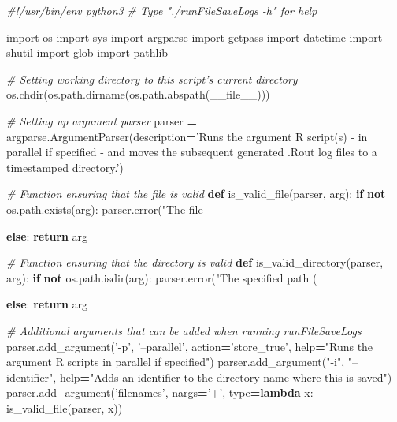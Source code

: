 \documentclass[]{book}
\newenvironment{Shaded}{\begin{snugshade}}{\end{snugshade}}
\newcommand{\KeywordTok}[1]{\textcolor[rgb]{0.13,0.29,0.53}{\textbf{#1}}}
\newcommand{\SpecialCharTok}[1]{\textcolor[rgb]{0.00,0.00,0.00}{#1}}
\newcommand{\StringTok}[1]{\textcolor[rgb]{0.31,0.60,0.02}{#1}}
\newcommand{\ImportTok}[1]{#1}
\newcommand{\CommentTok}[1]{\textcolor[rgb]{0.56,0.35,0.01}{\textit{#1}}}
\newcommand{\VariableTok}[1]{\textcolor[rgb]{0.00,0.00,0.00}{#1}}
\newcommand{\ControlFlowTok}[1]{\textcolor[rgb]{0.13,0.29,0.53}{\textbf{#1}}}
\newcommand{\OperatorTok}[1]{\textcolor[rgb]{0.81,0.36,0.00}{\textbf{#1}}}
\newcommand{\BuiltInTok}[1]{#1}
\newcommand{\NormalTok}[1]{#1}
\begin{document}
\begin{Shaded}
\begin{Highlighting}[]
\CommentTok{#!/usr/bin/env python3}
\CommentTok{# Type "./runFileSaveLogs -h" for help}

\ImportTok{import}\NormalTok{ os}
\ImportTok{import}\NormalTok{ sys}
\ImportTok{import}\NormalTok{ argparse}
\ImportTok{import}\NormalTok{ getpass}
\ImportTok{import}\NormalTok{ datetime}
\ImportTok{import}\NormalTok{ shutil}
\ImportTok{import}\NormalTok{ glob}
\ImportTok{import}\NormalTok{ pathlib}

\CommentTok{# Setting working directory to this script's current directory}
\NormalTok{os.chdir(os.path.dirname(os.path.abspath(}\VariableTok{__file__}\NormalTok{)))}

\CommentTok{# Setting up argument parser}
\NormalTok{parser }\OperatorTok{=}\NormalTok{ argparse.ArgumentParser(description}\OperatorTok{=}\StringTok{'Runs the argument R script(s) - in parallel if specified - and moves the subsequent generated .Rout log files to a timestamped directory.'}\NormalTok{)}

\CommentTok{# Function ensuring that the file is valid}
\KeywordTok{def}\NormalTok{ is_valid_file(parser, arg):}
    \ControlFlowTok{if} \KeywordTok{not}\NormalTok{ os.path.exists(arg):}
\NormalTok{        parser.error(}\StringTok{"The file }\SpecialCharTok{%
    \ControlFlowTok{else}\NormalTok{:}
        \ControlFlowTok{return}\NormalTok{ arg}

\CommentTok{# Function ensuring that the directory is valid}
\KeywordTok{def}\NormalTok{ is_valid_directory(parser, arg):}
    \ControlFlowTok{if} \KeywordTok{not}\NormalTok{ os.path.isdir(arg):}
\NormalTok{        parser.error(}\StringTok{"The specified path (}\SpecialCharTok{%
    \ControlFlowTok{else}\NormalTok{:}
        \ControlFlowTok{return}\NormalTok{ arg}

\CommentTok{# Additional arguments that can be added when running runFileSaveLogs}
\NormalTok{parser.add_argument(}\StringTok{'-p'}\NormalTok{, }\StringTok{'--parallel'}\NormalTok{, action}\OperatorTok{=}\StringTok{'store_true'}\NormalTok{, }\BuiltInTok{help}\OperatorTok{=}\StringTok{"Runs the argument R scripts in parallel if specified"}\NormalTok{)}
\NormalTok{parser.add_argument(}\StringTok{"-i"}\NormalTok{, }\StringTok{"--identifier"}\NormalTok{, }\BuiltInTok{help}\OperatorTok{=}\StringTok{"Adds an identifier to the directory name where this is saved"}\NormalTok{)}
\NormalTok{parser.add_argument(}\StringTok{'filenames'}\NormalTok{, nargs}\OperatorTok{=}\StringTok{'+'}\NormalTok{, }\BuiltInTok{type}\OperatorTok{=}\KeywordTok{lambda}\NormalTok{ x: is_valid_file(parser, x))}

}}
\end{Highlighting}
\end{Shaded}
\end{document}
